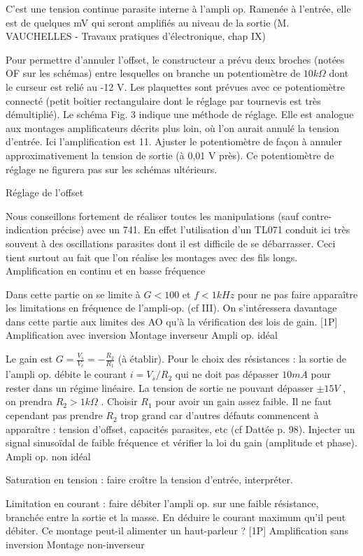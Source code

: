 \documentclass{article}%
\begin{document}
C'est une tension continue parasite interne à l'ampli op. Ramenée à l'entrée, elle est de quelques mV qui seront amplifiés au niveau de la sortie (M. VAUCHELLES - Travaux pratiques d'électronique, chap IX)

Pour permettre d'annuler l'offset, le constructeur a prévu deux broches (notées OF sur les schémas) entre lesquelles on branche un potentiomètre de $10 k\Omega$ dont le curseur est relié au -12 V. Les plaquettes sont prévues avec ce potentiomètre connecté (petit boîtier rectangulaire dont le réglage par tournevis est très démultiplié). Le schéma Fig. 3 indique une méthode de réglage. Elle est analogue aux montages amplificateurs décrits plus loin, où l'on aurait annulé la tension d'entrée. Ici l'amplification est 11. Ajuster le potentiomètre de façon à annuler approximativement la tension de sortie (à 0,01 V près). Ce potentiomètre de réglage ne figurera pas sur les schémas ultérieurs.

Réglage de l'offset

Nous conseillons fortement de réaliser toutes les manipulations (sauf contre-indication précise) avec un 741. En effet l'utilisation d'un TL071 conduit ici très souvent à des oscillations parasites dont il est difficile de se débarrasser. Ceci tient surtout au fait que l'on réalise les montages avec des fils longs.
Amplification en continu et en basse fréquence

Dans cette partie on se limite à $G < 100$ et $f < 1 kHz$ pour ne pas faire apparaître les limitations en fréquence de l'ampli-op. (cf III). On s'intéressera davantage dans cette partie aux limites des AO qu'à la vérification des lois de gain.
[1P] Amplification avec inversion
Montage inverseur
Ampli op. idéal

Le gain est $G = \frac{V_s}{V_e} = -\frac{R_2}{R_1}$ (à établir). Pour le choix des résistances : la sortie de l'ampli op. débite le courant $i=V_s/R_2$ qui ne doit pas dépasser $10 mA$ pour rester dans un régime linéaire. La tension de sortie ne pouvant dépasser $\pm 15 V$ , on prendra $ R_{2} > 1 k \Omega$ . Choisir $R_{1}$ pour avoir un gain assez faible. Il ne faut cependant pas prendre $ R_{2}$ trop grand car d'autres défauts commencent à apparaître : tension d'offset, capacités parasites, etc (cf Dattée p. 98). Injecter un signal sinusoïdal de faible fréquence et vérifier la loi du gain (amplitude et phase).
Ampli op. non idéal

Saturation en tension : faire croître la tension d'entrée, interpréter.

Limitation en courant : faire débiter l'ampli op. sur une faible résistance, branchée entre la sortie et la masse. En déduire le courant maximum qu'il peut débiter. Ce montage peut-il alimenter un haut-parleur ?
[1P] Amplification sans inversion
Montage non-inverseur
\end{document}
